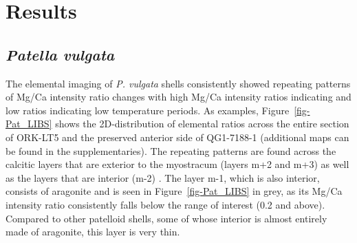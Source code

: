 \documentclass[
  authoryear,
  preprint,
  3p]{elsarticle}
\begin{document}
\section{Results}\label{Results}

\subsection{\texorpdfstring{\emph{Patella
vulgata}}{Patella vulgata}}\label{patella-vulgata}

The elemental imaging of \emph{P. vulgata} shells consistently showed
repeating patterns of Mg/Ca intensity ratio changes with high Mg/Ca
intensity ratios indicating and low ratios indicating low temperature
periods. As examples, Figure~\ref{fig-Pat_LIBS} shows the
2D-distribution of elemental ratios across the entire section of ORK-LT5
and the preserved anterior side of QG1-7188-1 (additional maps can be
found in the supplementaries). The repeating patterns are found across
the calcitic layers that are exterior to the myostracum (layers m+2 and
m+3) as well as the layers that are interior (m-2)
\citep{Fenger2007-gf}. The layer m-1, which is also interior, consists
of aragonite and is seen in Figure~\ref{fig-Pat_LIBS} in grey, as its
Mg/Ca intensity ratio consistently falls below the range of interest
(0.2 and above). Compared to other patelloid shells, some of whose
interior is almost entirely made of aragonite, this layer is very thin.
\newline
\end{document}
